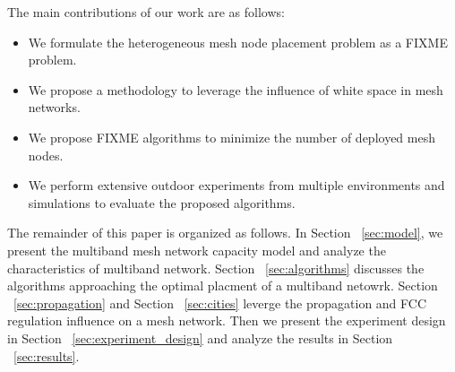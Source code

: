 % 
The main contributions of our work are as follows:
\begin{itemize}
\item We formulate the heterogeneous mesh node placement problem as a FIXME problem.  

\item We propose a methodology to leverage the influence of white space in mesh networks.

\item We propose FIXME algorithms to minimize the number of deployed mesh nodes.

\item We perform extensive outdoor experiments from multiple environments and simulations to evaluate the proposed algorithms.


\end{itemize}



The remainder of this paper is organized as follows. In Section ~\ref{sec:model}, we present the multiband mesh network capacity model and analyze the characteristics of multiband network. 
Section ~\ref{sec:algorithms} discusses the algorithms approaching the optimal placment of a multiband netowrk. 
Section ~\ref{sec:propagation} and Section ~\ref{sec:cities} leverge the propagation and FCC regulation influence on a mesh network.
Then we present the experiment design in Section ~\ref{sec:experiment_design} and analyze the results in Section ~\ref{sec:results}.

